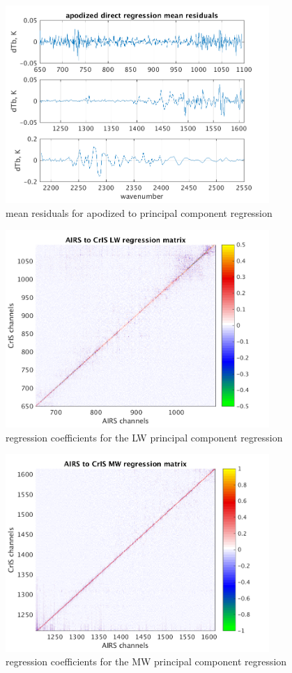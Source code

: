 \documentclass[11pt]{article}
\begin{document}
\begin{figure} %
  \centering
  \includegraphics[height=7.5cm]{slackfigs/ap_pc_direct_regr.png}
  \caption{mean residuals for apodized {\airs} to {\cris} principal
    component regression}
  \label{dreg6}
\end{figure}

\begin{figure} %
  \centering
  \includegraphics[height=7.5cm]{slackfigs/LW_pc_regr_mat.png}
  \caption{regression coefficients for the LW principal component
    regression}
  \label{dreg7}
\end{figure}

\begin{figure} %
  \centering
  \includegraphics[height=7.5cm]{slackfigs/MW_pc_regr_mat.png}
  \caption{regression coefficients for the MW principal component
    regression}
  \label{dreg8}
\end{figure}
\end{document}
